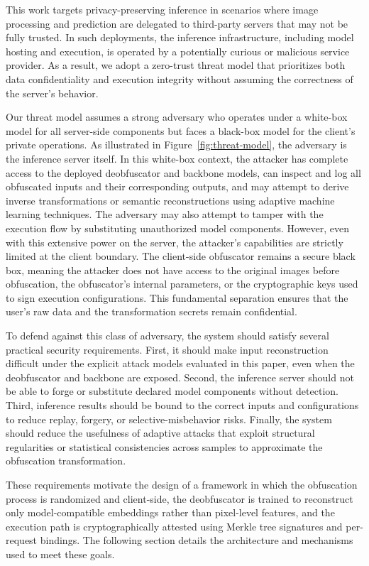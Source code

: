 \documentclass{ieeeaccess}
\newcommand{\rev}[1]{{\color{black}#1}}
\begin{document}
This work targets privacy-preserving inference in scenarios where image processing and prediction are delegated to third-party servers that may not be fully trusted. In such deployments, the inference infrastructure, including model hosting and execution, is operated by a potentially curious or malicious service provider. As a result, we adopt a zero-trust threat model that prioritizes both data confidentiality and execution integrity without assuming the correctness of the server's behavior.

{Our threat model assumes a strong adversary who operates under a white-box model for all server-side components but faces a black-box model for the client's private operations. As illustrated in Figure}~\ref{fig:threat-model}{, the adversary is the inference server itself. In this white-box context, the attacker has complete access to the deployed deobfuscator and backbone models, can inspect and log all obfuscated inputs and their corresponding outputs, and may attempt to derive inverse transformations or semantic reconstructions using adaptive machine learning techniques. The adversary may also attempt to tamper with the execution flow by substituting unauthorized model components. However, even with this extensive power on the server, the attacker's capabilities are strictly limited at the client boundary. The client-side obfuscator remains a secure black box, meaning the attacker does not have access to the original images before obfuscation, the obfuscator's internal parameters, or the cryptographic keys used to sign execution configurations. This fundamental separation ensures that the user's raw data and the transformation secrets remain confidential.}


\rev{To defend against this class of adversary, the system should satisfy several practical security requirements. First, it should make input reconstruction difficult under the explicit attack models evaluated in this paper, even when the deobfuscator and backbone are exposed. Second, the inference server should not be able to forge or substitute declared model components without detection. Third, inference results should be bound to the correct inputs and configurations to reduce replay, forgery, or selective-misbehavior risks. Finally, the system should reduce the usefulness of adaptive attacks that exploit structural regularities or statistical consistencies across samples to approximate the obfuscation transformation.}

These requirements motivate the design of a framework in which the obfuscation process is randomized and client-side, the deobfuscator is trained to reconstruct only model-compatible embeddings rather than pixel-level features, and the execution path is cryptographically attested using Merkle tree signatures and per-request bindings. The following section details the architecture and mechanisms used to meet these goals.
\end{document}
